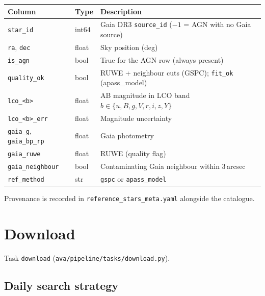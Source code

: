 \documentclass[12pt,a4paper]{article}
\begin{document}
\begin{center}
\small
\begin{tabular}{lll}
\toprule
Column & Type & Description \\
\midrule
\texttt{star\_id} & int64 & Gaia DR3 \texttt{source\_id} ($-1$ = AGN with no Gaia source) \\
\texttt{ra}, \texttt{dec} & float & Sky position (deg) \\
\texttt{is\_agn} & bool & True for the AGN row (always present) \\
\texttt{quality\_ok} & bool & RUWE + neighbour cuts (GSPC); \texttt{fit\_ok} (apass\_model) \\
\texttt{lco\_<b>} & float & AB magnitude in LCO band $b \in \{u,B,g,V,r,i,z,Y\}$ \\
\texttt{lco\_<b>\_err} & float & Magnitude uncertainty \\
\texttt{gaia\_g}, \texttt{gaia\_bp\_rp} & float & Gaia photometry \\
\texttt{gaia\_ruwe} & float & RUWE (quality flag) \\
\texttt{gaia\_neighbour} & bool & Contaminating Gaia neighbour within 3\,arcsec \\
\texttt{ref\_method} & str & \texttt{gspc} or \texttt{apass\_model} \\
\bottomrule
\end{tabular}
\end{center}

Provenance is recorded in \texttt{reference\_\hspace{0pt}stars\_\hspace{0pt}meta.yaml} alongside the
catalogue.

\section{Download}
\label{sec:download}

Task \texttt{download} (\texttt{ava/\hspace{0pt}pipeline/\hspace{0pt}tasks/\hspace{0pt}download.py}).

\subsection{Daily search strategy}
\end{document}
